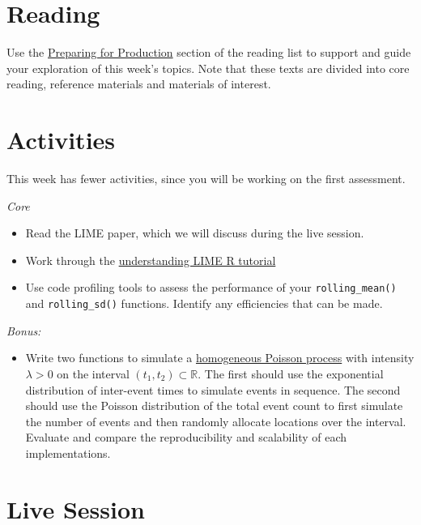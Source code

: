 \documentclass[
  12pt,
]{book}
\providecommand{\tightlist}{%
  \setlength{\itemsep}{0pt}\setlength{\parskip}{0pt}}
\begin{document}
\hypertarget{reading-3}{%
\section{Reading}\label{reading-3}}

Use the \protect\hyperlink{production-reading}{Preparing for Production} section of the reading list to support and guide your exploration of this week's topics. Note that these texts are divided into core reading, reference materials and materials of interest.

\hypertarget{activities-1}{%
\section{Activities}\label{activities-1}}

This week has fewer activities, since you will be working on the first assessment.

\emph{Core}

\begin{itemize}
\item
  Read the LIME paper, which we will discuss during the live session.
\item
  Work through the \href{https://cran.r-project.org/web/packages/lime/vignettes/Understanding_lime.html}{understanding LIME R tutorial}
\item
  Use code profiling tools to assess the performance of your \texttt{rolling\_mean()} and \texttt{rolling\_sd()} functions. Identify any efficiencies that can be made.
\end{itemize}

\emph{Bonus:}

\begin{itemize}
\tightlist
\item
  Write two functions to simulate a \href{https://en.wikipedia.org/wiki/Poisson_point_process\#Homogeneous_case_2}{homogeneous Poisson process} with intensity \(\lambda >0\) on the interval \((t_1, t_2) \subset \mathbb{R}\). The first should use the exponential distribution of inter-event times to simulate events in sequence. The second should use the Poisson distribution of the total event count to first simulate the number of events and then randomly allocate locations over the interval. Evaluate and compare the reproducibility and scalability of each implementations.
\end{itemize}

\hypertarget{live-session-3}{%
\section{Live Session}\label{live-session-3}}
\end{document}
